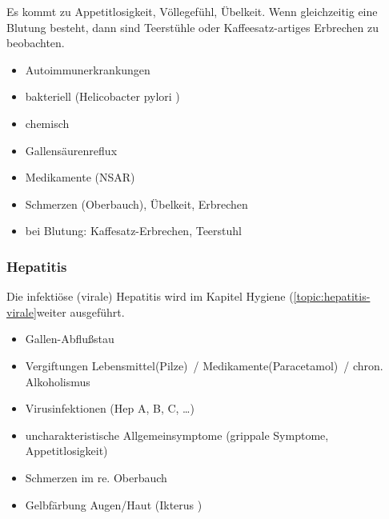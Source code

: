 \gMarried
{

Es kommt zu Appetitlosigkeit, Völlegefühl, Übelkeit. Wenn
gleichzeitig eine Blutung besteht, dann sind Teerstühle
oder Kaffeesatz-artiges Erbrechen zu beobachten.}
{
\begin{itemize}
\item Autoimmunerkrankungen
\item bakteriell (Helicobacter pylori )
\item chemisch
\item Gallensäurenreflux
\item Medikamente (NSAR)
\end{itemize}


\begin{itemize}
\item Schmerzen (Oberbauch), \"Ubelkeit, Erbrechen
\item bei Blutung: Kaffesatz-Erbrechen,  Teerstuhl
\end{itemize}}





\subsubsection{Hepatitis}


Die infektiöse (virale) Hepatitis wird im Kapitel Hygiene
(\ref{topic:hepatitis-virale}weiter ausgeführt.

\gMarried
{}
{

\begin{itemize}
    \item Gallen-Abflu{\ss}stau
    \item Vergiftungen Lebensmittel(Pilze)~/
    Medikamente(Paracetamol)~/ chron. Alkoholismus
    \item Virusinfektionen (Hep A, B, C, \ldots )
\end{itemize}


\begin{itemize}
    \item uncharakteristische Allgemeinsymptome (grippale Symptome,
Appetitlosigkeit)
\item Schmerzen im re. Oberbauch
\item Gelbfärbung Augen/Haut (Ikterus )
\end{itemize}}



